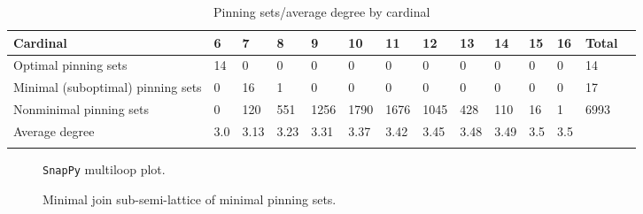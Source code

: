 \documentclass{article}%
\begin{document}
\begin{table}[ht]
	\caption{Pinning sets/average degree by cardinal}
	\centering
	\renewcommand{\arraystretch}{1.5}
	\begin{tabularx}{\textwidth}{lXXXXXXXXXXXXX}
		\toprule
			Cardinal & 6 & 7 & 8 & 9 & 10 & 11 & 12 & 13 & 14 & 15 & 16 & Total\\
			\hline
			Optimal pinning sets & 14 & 0 & 0 & 0 & 0 & 0 & 0 & 0 & 0 & 0 & 0 & 14 \\
			Minimal (suboptimal) pinning sets & 0 & 16 & 1 & 0 & 0 & 0 & 0 & 0 & 0 & 0 & 0 & 17 \\
			Nonminimal pinning sets & 0 & 120 & 551 & 1256 & 1790 & 1676 & 1045 & 428 & 110 & 16 & 1 & 6993 \\
			Average degree & 3.0 & 3.13 & 3.23 & 3.31 & 3.37 & 3.42 & 3.45 & 3.48 & 3.49 & 3.5 & 3.5 &  \\
		\bottomrule \\ 
	\end{tabularx}
\end{table}

\begin{multicols}{2}
\begin{figure}[H]
\centering

\caption{\texttt{SnapPy} multiloop plot.}
\label{fig:tex/img/[[10, 28, 1, 11], [11, 22, 12, 23], [23, 9, 24, 10], [27, 16, 28, 17], [1, 16, 2, 15], [7, 21, 8, 22], [12, 8, 13, 9], [24, 5, 25, 4], [17, 4, 18, 3], [26, 2, 27, 3], [6, 14, 7, 15], [20, 13, 21, 14],.svg}
\end{figure}
\columnbreak

\begin{figure}[H]
\centering
\scalebox{0.8}{}
\caption{Minimal join sub-semi-lattice of minimal pinning sets.}
\label{fig:tex/img/[[10, 28, 1, 11], [11, 22, 12, 23], [23, 9, 24, 10], [27, 16, 28, 17], [1, 16, 2, 15], [7, 21, 8, 22], [12, 8, 13, 9], [24, 5, 25, 4], [17, 4, 18, 3], [26, 2, 27, 3], [6, 14, 7, 15], [20, 13, 21, 14],.pgf}
\end{figure}
\end{multicols}
\end{document}
